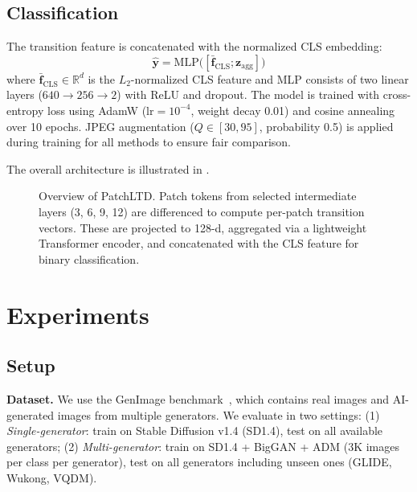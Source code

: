 \documentclass[runningheads]{llncs}
\newcommand{\ours}{PatchLTD}
\begin{document}
\subsection{Classification}
\label{sec:classification}

The transition feature is concatenated with the normalized CLS embedding:
\begin{equation}
    \hat{\mathbf{y}} = \text{MLP}\!\big([\bar{\mathbf{f}}_{\text{CLS}}; \mathbf{z}_{\text{agg}}]\big)
\end{equation}
where $\bar{\mathbf{f}}_{\text{CLS}} \in \mathbb{R}^d$ is the $L_2$-normalized CLS feature and MLP consists of two linear layers ($640 \to 256 \to 2$) with ReLU and dropout.
The model is trained with cross-entropy loss using AdamW ($\text{lr}{=}10^{-4}$, weight decay 0.01) and cosine annealing over 10 epochs.
JPEG augmentation ($Q \in [30, 95]$, probability 0.5) is applied during training for all methods to ensure fair comparison.

The overall architecture is illustrated in .

\begin{figure}[t]
    \centering
    
    \caption{Overview of \ours{}. Patch tokens from selected intermediate layers (3, 6, 9, 12) are differenced to compute per-patch transition vectors. These are projected to 128-d, aggregated via a lightweight Transformer encoder, and concatenated with the CLS feature for binary classification.}
    \label{fig:architecture}
\end{figure}


\section{Experiments}
\label{sec:experiments}

\subsection{Setup}

\noindent\textbf{Dataset.}
We use the GenImage benchmark~\cite{zhu2024genimage}, which contains real images and AI-generated images from multiple generators.
We evaluate in two settings:
(1) \emph{Single-generator}: train on Stable Diffusion v1.4 (SD1.4), test on all available generators;
(2) \emph{Multi-generator}: train on SD1.4 + BigGAN + ADM (3K images per class per generator), test on all generators including unseen ones (GLIDE, Wukong, VQDM).
\end{document}
